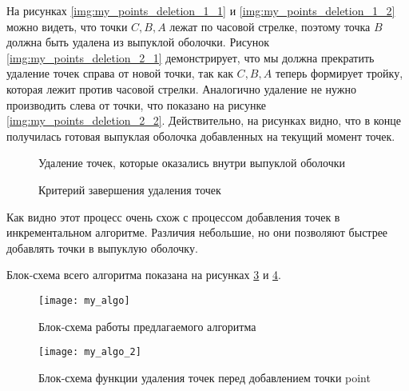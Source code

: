На рисунках \ref{img:my_points_deletion_1_1} и \ref{img:my_points_deletion_1_2} можно видеть, что точки $C, B, A$ лежат по часовой стрелке, поэтому точка $B$ должна быть удалена из выпуклой оболочки. Рисунок \ref{img:my_points_deletion_2_1} демонстрирует, что мы должна прекратить удаление точек справа от новой точки, так как $C, B, A$ теперь формирует тройку, которая лежит против часовой стрелки. Аналогично удаление не нужно производить слева от точки, что показано на рисунке \ref{img:my_points_deletion_2_2}. Действительно, на рисунках видно, что в конце получилась готовая выпуклая оболочка добавленных на текущий момент точек.

\begin{figure}[H]
	{\centering
		\hfill
		\hfill
		\hfill
	}
	\caption{Удаление точек, которые оказались внутри выпуклой оболочки}
	\label{img:my_points_deletion_1}
\end{figure}

\begin{figure}[H]
	{\centering
		\hfill
		\hfill
		\hfill
	}
	\caption{Критерий завершения удаления точек}
	\label{img:my_points_deletion_2}
\end{figure}

Как видно этот процесс очень схож с процессом добавления точек в инкрементальном алгоритме. Различия небольшие, но они позволяют быстрее добавлять точки в выпуклую оболочку.

Блок-схема всего алгоритма показана на рисунках \ref{img:my_algo} и \ref{img:my_algo_deletion}.

\begin{figure}[H]
	\centering
	\texttt{[image: my\_algo]}
	\caption{Блок-схема работы предлагаемого алгоритма}
	\label{img:my_algo}
\end{figure}

\begin{figure}[H]
	\centering
	\texttt{[image: my\_algo\_2]}
	\caption{Блок-схема функции удаления точек перед добавлением точки point}
	\label{img:my_algo_deletion}
\end{figure}

